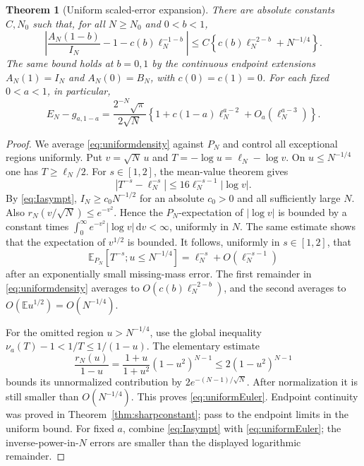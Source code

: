 \documentclass[11pt]{article}
\numberwithin{equation}{section}
\newtheorem{theorem}{Theorem}[section]
\theoremstyle{definition}\newtheorem{definition}[theorem]{Definition}
\theoremstyle{remark}\newtheorem{remark}[theorem]{Remark}
\newcommand{\dd}{\,\mathrm d}
\newcommand{\E}{\mathbb E}
\begin{document}
\begin{theorem}[Uniform scaled-error expansion]\label{thm:uniformEuler}
There are absolute constants $C,N_0$ such that, for all $N\ge N_0$
and $0<b<1$,
\begin{equation}\label{eq:uniformEuler}
 \left|\frac{A_N(1-b)}{I_N}-1-c(b)\ell_N^{-1-b}\right|
 \le C\left\{c(b)\ell_N^{-2-b}+N^{-1/4}\right\}.
\end{equation}
The same bound holds at $b=0,1$ by the continuous endpoint extensions
$A_N(1)=I_N$ and $A_N(0)=B_N$, with $c(0)=c(1)=0$.
For each fixed $0<a<1$, in particular,
\begin{equation}\label{eq:fixedEuler}
 E_N-g_{a,1-a}
 =\frac{2^{-N}\sqrt\pi}{2\sqrt N}
 \left\{1+c(1-a)\ell_N^{a-2}
             +O_a(\ell_N^{a-3})\right\}.
\end{equation}
\end{theorem}
\begin{proof}
We average \eqref{eq:uniformdensity} against $P_N$ and control all
exceptional regions uniformly. Put $v=\sqrt N\,u$ and
$T=-\log u=\ell_N-\log v$. On $u\le N^{-1/4}$ one has
$T\ge\ell_N/2$. For $s\in[1,2]$, the mean-value theorem gives
\[
 |T^{-s}-\ell_N^{-s}|
 \le16\ell_N^{-s-1}|\log v|.
\]
By \eqref{eq:Iasympt}, $I_N\ge c_0N^{-1/2}$ for an absolute
$c_0>0$ and all sufficiently large $N$. Also
$r_N(v/\sqrt N)\le e^{-v^2}$. Hence the $P_N$-expectation of
$|\log v|$ is bounded by a constant times
$\int_0^\infty e^{-v^2}|\log v|\dd v<\infty$, uniformly in $N$.
The same estimate shows that the expectation of $v^{1/2}$ is bounded.
It follows, uniformly in $s\in[1,2]$, that
\[
 \E_{P_N}[T^{-s};u\le N^{-1/4}]
 =\ell_N^{-s}+O(\ell_N^{-s-1})
\]
after an exponentially small missing-mass error. The first remainder
in \eqref{eq:uniformdensity} averages to
$O(c(b)\ell_N^{-2-b})$, and the second averages to
$O(\E u^{1/2})=O(N^{-1/4})$.

For the omitted region $u>N^{-1/4}$, use the global inequality
$\nu_a(T)-1<1/T\le1/(1-u)$. The elementary estimate
\[
 \frac{r_N(u)}{1-u}
 =\frac{1+u}{1+u^2}(1-u^2)^{N-1}
 \le2(1-u^2)^{N-1}
\]
bounds its unnormalized contribution by
$2e^{-(N-1)/\sqrt N}$. After normalization it is still smaller
than $O(N^{-1/4})$. This proves \eqref{eq:uniformEuler}.
Endpoint continuity was proved in Theorem~\ref{thm:sharpconstant};
pass to the endpoint limits in the uniform bound.
For fixed $a$, combine \eqref{eq:Iasympt} with
\eqref{eq:uniformEuler}; the inverse-power-in-$N$ errors are smaller
than the displayed logarithmic remainder.
\end{proof}
\end{document}
